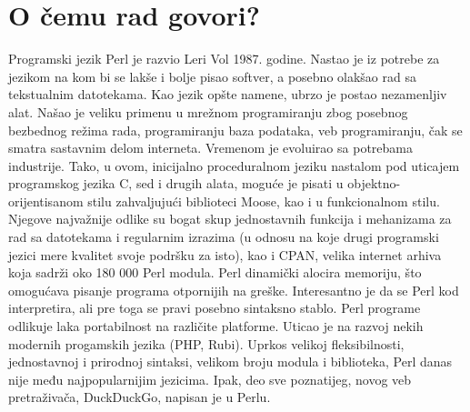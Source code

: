 \documentclass[a4paper]{report}
\begin{document}
\section{O čemu rad govori?}
Programski jezik Perl je razvio Leri Vol 1987. godine. Nastao je iz  potrebe za jezikom na kom bi se lakše i bolje pisao softver, a posebno olakšao rad sa tekstualnim datotekama. Kao jezik opšte namene, ubrzo je postao nezamenljiv alat. Našao je veliku primenu u mrežnom programiranju zbog posebnog bezbednog režima rada, programiranju baza podataka, veb programiranju, čak se smatra sastavnim delom interneta. Vremenom je evoluirao sa potrebama industrije. Tako, u ovom, inicijalno proceduralnom jeziku nastalom pod uticajem programskog jezika C, sed i drugih alata, moguće je pisati u objektno-orijentisanom stilu zahvaljujući biblioteci Moose, kao i u funkcionalnom stilu. Njegove najvažnije odlike su bogat skup jednostavnih  funkcija i mehanizama za rad sa datotekama i regularnim izrazima (u odnosu na koje drugi programski jezici mere kvalitet svoje podršku za isto), kao i CPAN, velika internet arhiva koja sadrži oko 180 000 Perl modula. Perl dinamički alocira memoriju, što omogućava pisanje programa otpornijih na greške. Interesantno je da se Perl kod interpretira, ali pre toga se pravi posebno sintaksno stablo. Perl programe odlikuje laka portabilnost na različite platforme. Uticao je na razvoj nekih modernih progamskih jezika (PHP, Rubi). Uprkos velikoj fleksibilnosti, jednostavnoj i prirodnoj sintaksi, velikom broju modula i biblioteka, Perl danas nije među najpopularnijim jezicima. Ipak, deo sve poznatijeg, novog veb pretraživača, DuckDuckGo, napisan je u Perlu. 
\end{document}
